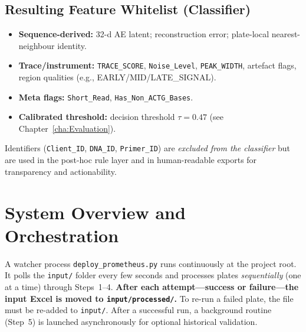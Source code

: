 \subsection{Resulting Feature Whitelist (Classifier)}
\label{sec:whitelist}
\begin{itemize}
  \item \textbf{Sequence-derived:} 32-d AE latent; reconstruction error; plate-local nearest-neighbour identity.
  \item \textbf{Trace/instrument:} \texttt{TRACE\_SCORE}, \texttt{Noise\_Level}, \texttt{PEAK\_WIDTH}, artefact flags, region qualities (e.g., EARLY/MID/LATE\_SIGNAL).
  \item \textbf{Meta flags:} \texttt{Short\_Read}, \texttt{Has\_Non\_ACTG\_Bases}.
  \item \textbf{Calibrated threshold:} decision threshold $\tau=0.47$ (see Chapter~\ref{cha:Evaluation}).
\end{itemize}
Identifiers (\texttt{Client\_ID}, \texttt{DNA\_ID}, \texttt{Primer\_ID}) are \emph{excluded from the classifier} but are used in the post-hoc rule layer and in human-readable exports for transparency and actionability.


\section{System Overview and Orchestration}
\label{sec:system_overview}

A watcher process \texttt{deploy\_prometheus.py} runs continuously at the project root. It polls the \texttt{input/} folder every few seconds and processes plates \emph{sequentially} (one at a time) through Steps~1--4. \textbf{After each attempt—success or failure—the input Excel is moved to \texttt{input/processed/}.} To re-run a failed plate, the file must be re-added to \texttt{input/}. After a successful run, a background routine (Step~5) is launched asynchronously for optional historical validation.

